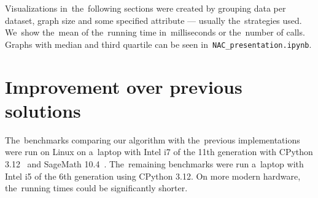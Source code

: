 Visualizations in~the~following sections were created by grouping data per dataset,
graph size and some specified attribute --- usually the~strategies used.
%
We~show the~mean of the~running time in~milliseconds or
the~number of \IsNACColoring{} calls.
%
Graphs with median and third quartile can be seen in~\texttt{NAC\_presentation.ipynb}.


\section{Improvement over previous solutions}

The~benchmarks comparing our algorithm with the~previous implementations
were run on Linux on a~laptop with Intel i7 of the 11th generation
with CPython 3.12~\cite{cpython} and SageMath 10.4~\cite{sagemath}.
The~remaining benchmarks were run a~laptop with Intel i5 of the 6th generation
using CPython 3.12.
On more modern hardware, the~running times could be significantly shorter.

